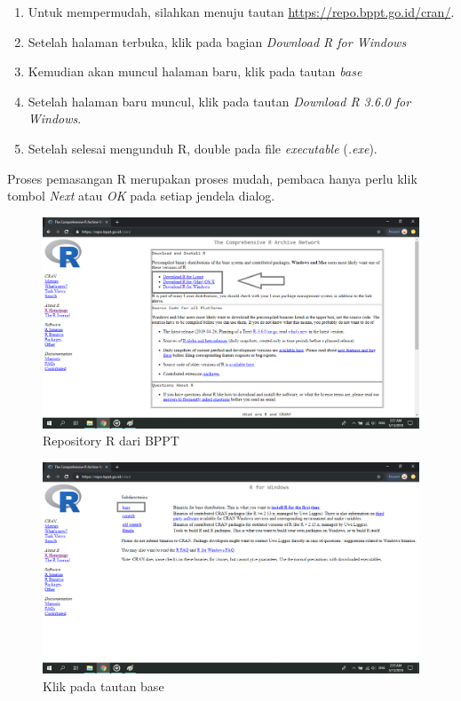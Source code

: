 \documentclass[]{book}
\providecommand{\tightlist}{%
  \setlength{\itemsep}{0pt}\setlength{\parskip}{0pt}}
\begin{document}
\begin{enumerate}
\def\labelenumi{\arabic{enumi}.}
\tightlist
\item
  Untuk mempermudah, silahkan menuju tautan
  \url{https://repo.bppt.go.id/cran/}.
\item
  Setelah halaman terbuka, klik pada bagian \emph{Download R for
  Windows}
\item
  Kemudian akan muncul halaman baru, klik pada tautan \emph{base}
\item
  Setelah halaman baru muncul, klik pada tautan \emph{Download R 3.6.0
  for Windows}.
\item
  Setelah selesai mengunduh R, double pada file \emph{executable}
  (\emph{.exe}).
\end{enumerate}

Proses pemasangan R merupakan proses mudah, pembaca hanya perlu klik
tombol \emph{Next} atau \emph{OK} pada setiap jendela dialog.

\begin{figure}
\centering
\includegraphics{Gambar/r-download/06.png}
\caption{\label{fig:install-r-1}Repository R dari BPPT}
\end{figure}

\begin{figure}
\centering
\includegraphics{Gambar/r-download/07.png}
\caption{\label{fig:install-r-2}Klik pada tautan base}
\end{figure}
\end{document}
